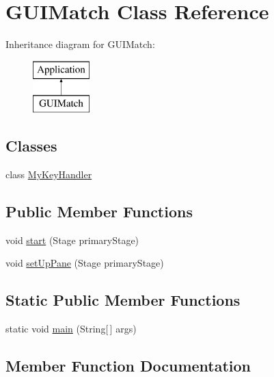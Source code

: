 \hypertarget{class_g_u_i_match}{}\section{G\+U\+I\+Match Class Reference}
\label{class_g_u_i_match}
Inheritance diagram for G\+U\+I\+Match\+:\begin{figure}[H]
\begin{center}
\leavevmode
\includegraphics[height=2.000000cm]{class_g_u_i_match}
\end{center}
\end{figure}
\subsection*{Classes}
\begin{DoxyCompactItemize}
\item 
class \mbox{\hyperlink{class_g_u_i_match_1_1_my_key_handler}{My\+Key\+Handler}}
\end{DoxyCompactItemize}
\subsection*{Public Member Functions}
\begin{DoxyCompactItemize}
\item 
void \mbox{\hyperlink{class_g_u_i_match_a286efdec3789581a2892444cb193fe00}{start}} (Stage primary\+Stage)
\item 
void \mbox{\hyperlink{class_g_u_i_match_aa9f4fe916a6de3e9968e6eab465eb6e7}{set\+Up\+Pane}} (Stage primary\+Stage)
\end{DoxyCompactItemize}
\subsection*{Static Public Member Functions}
\begin{DoxyCompactItemize}
\item 
static void \mbox{\hyperlink{class_g_u_i_match_a76cccc2f3888f404094e9984d9fac3c8}{main}} (String\mbox{[}$\,$\mbox{]} args)
\end{DoxyCompactItemize}


\subsection{Member Function Documentation}
\mbox{\label{class_g_u_i_match_a76cccc2f3888f404094e9984d9fac3c8}} 

